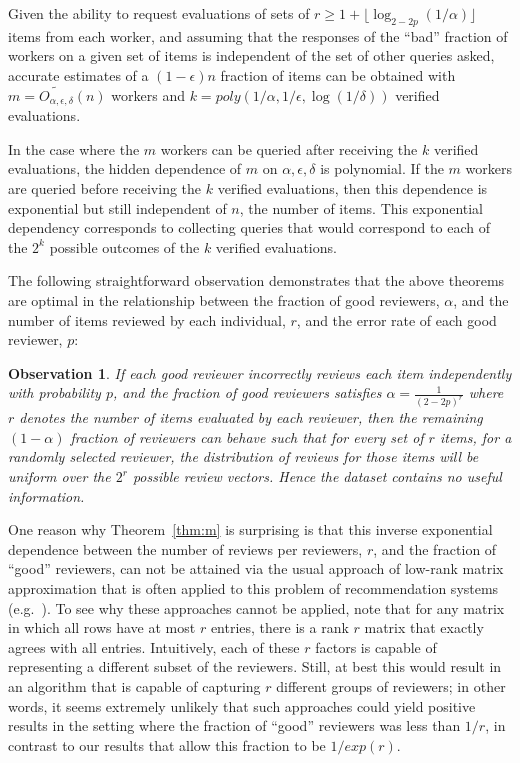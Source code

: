 \documentclass[anon,12pt]{colt2018}
\newtheorem{observation}{Observation}
\newcommand{\eps}{\epsilon}
\begin{document}
\begin{theorem}\label{thm:lin}
Given the ability to request evaluations of sets of $r \ge 1+\lfloor \log_{2-2p}(1/\alpha)\rfloor$ items from each worker, and assuming that the responses of the ``bad'' fraction of workers on a given set of items is independent of the set of other queries asked, accurate estimates of a $(1-\eps)n$ fraction of items can be obtained with $m = \tilde{O_{\alpha,\eps,\delta}}(n)$ workers and $k=poly(1/\alpha,1/\eps,\log(1/\delta))$ verified evaluations.
\end{theorem}

In the case where the $m$ workers can be queried after receiving the $k$ verified evaluations, the hidden dependence of $m$ on $\alpha,\eps,\delta$ is polynomial.  If the $m$ workers are queried before receiving the $k$ verified evaluations, then this dependence is exponential but still independent of $n$, the number of items.  This exponential dependency corresponds to collecting queries that would correspond to each of the $2^k$ possible outcomes of the $k$ verified evaluations.



The following straightforward observation demonstrates that the above theorems are optimal in the relationship between the fraction of good reviewers, $\alpha$, and the number of items reviewed by each individual, $r$, and the error rate of each good reviewer, $p$:
\begin{observation}
If each good reviewer incorrectly reviews each item independently with probability $p$, and the fraction of good reviewers satisfies $\alpha = \frac{1}{(2-2p)^r}$ where $r$ denotes the number of items evaluated by each reviewer, then the remaining $(1-\alpha)$ fraction of reviewers can behave such that for every set of $r$ items, for a randomly selected reviewer, the distribution of reviews for those items will be uniform over the $2^r$ possible review vectors.  Hence the dataset contains no useful information.
\end{observation}


One reason why Theorem~\ref{thm:m} is surprising is that this inverse exponential dependence between the number of reviews per reviewers, $r$, and the fraction of ``good'' reviewers, can not be attained via the usual approach of low-rank matrix approximation that is often applied to this problem of recommendation systems (e.g.~\cite{candes2010matrix,keshavan2010matrix}).  To see why these approaches cannot be applied, note that for any matrix in which all rows have at most $r$ entries, there is a rank $r$ matrix that exactly agrees with all entries.  Intuitively, each of these $r$ factors is capable of representing a different subset of the reviewers.  Still, at best this would result in an algorithm that is capable of capturing $r$ different groups of reviewers; in other words, it seems extremely unlikely that such approaches could yield positive results in the setting where the fraction of ``good'' reviewers was less than $1/r$, in contrast to our results that allow this fraction to be $1/exp(r).$
\end{document}
